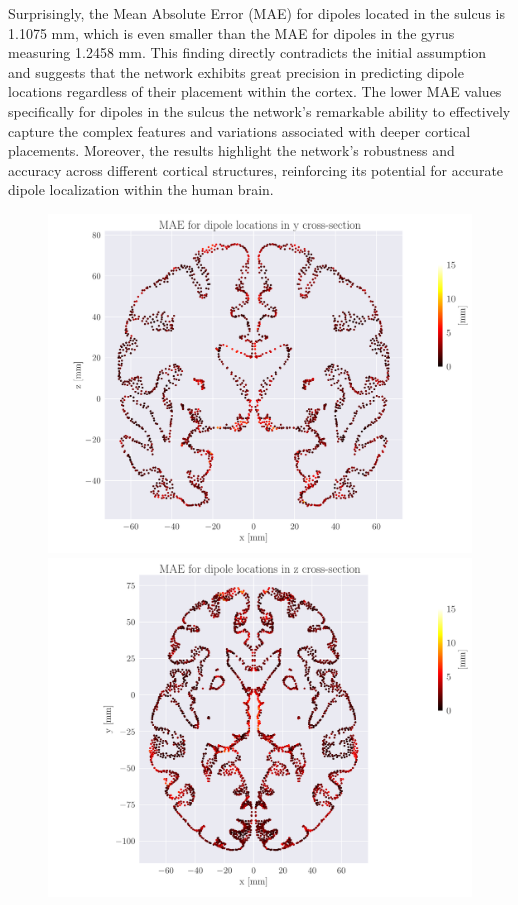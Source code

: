 \documentclass[a4paper, UKenglish, 11pt]{uiomaster}
\begin{document}
Surprisingly, the Mean Absolute Error (MAE) for dipoles located in the sulcus is 1.1075 mm, which is even smaller than the MAE for dipoles in the gyrus measuring 1.2458 mm. This finding directly contradicts the initial assumption and suggests that the network exhibits great precision in predicting dipole locations regardless of their placement within the cortex. The lower MAE values specifically for dipoles in the sulcus  the network's remarkable ability to effectively capture the complex features and variations associated with deeper cortical placements. Moreover, the results highlight the network's robustness and accuracy across different cortical structures, reinforcing its potential for accurate dipole localization within the human brain.


\begin{figure}[!htb]
    \centering
    \includegraphics[width=0.7\linewidth]{figures/NEW_simple_dipole_error_Euclidean Distance_0.pdf}
    \vspace{10pt} %
    \includegraphics[width=0.7\linewidth]{figures/NEW_simple_dipole_error_Euclidean Distance_1.pdf}

\end{figure}
\end{document}

